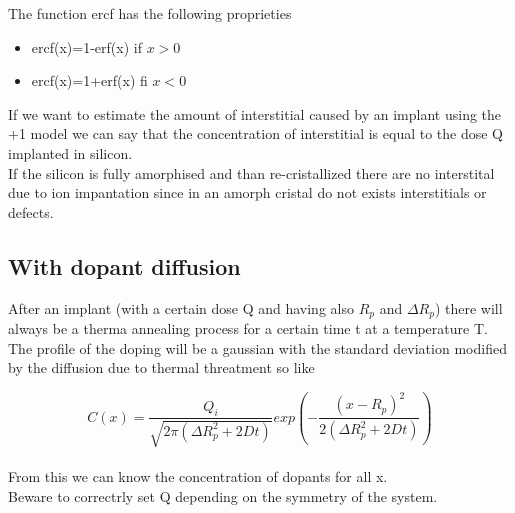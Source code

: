 The function ercf has the following proprieties 
\begin{itemize}
\item ercf(x)=1-erf(x) if $x>0$
\item ercf(x)=1+erf(x) fi $x<0$
\end{itemize}

\vspace{6mm}

If we want to estimate the amount of interstitial caused by an implant using the +1 model we can say that the concentration of interstitial is equal to the dose Q implanted in silicon.\\
If the silicon is fully amorphised and than re-cristallized there are no interstital due to ion impantation since in an amorph cristal do not exists interstitials or defects.\\


\subsection{With dopant diffusion}

After an implant (with a certain dose Q and having also $R_p$ and $\Delta R_p$) there will always be a therma annealing process for a certain time t at a temperature T.\\
The profile of the doping will be a gaussian with the standard deviation modified by the diffusion due to thermal threatment so like

\begin{equation}
C(x)=\frac{Q_i}{\sqrt{2\pi (\Delta R_p^2+2Dt)}}exp\left(-\frac{(x-R_p)^2}{2(\Delta R_p^2+2Dt)}\right)
\end{equation} 
\\
From this we can know the concentration of dopants for all x.\\
Beware to correctrly set Q depending on the symmetry of the system.\\


